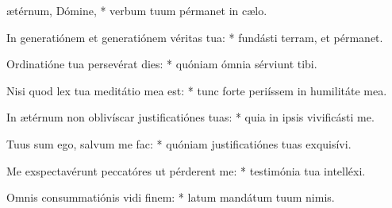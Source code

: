 \begin{psalmus}

 ætérnum, Dómine, * verbum tuum pérmanet in cælo.

In generatiónem et generatiónem véritas tua: * fundásti terram, et pérmanet.

Ordinatióne tua persevérat dies: * quóniam ómnia sérviunt tibi.

Nisi quod lex tua meditátio mea est: * tunc forte periíssem in humilitáte mea.

In ætérnum non oblivíscar justificatiónes tuas: * quia in ipsis vivificásti me.

Tuus sum ego, salvum me fac: * quóniam justificatiónes tuas exquisívi.

Me exspectavérunt peccatóres ut pérderent me: * testimónia tua intelléxi.

Omnis consummatiónis vidi finem: * latum mandátum tuum nimis.

\end{psalmus}
